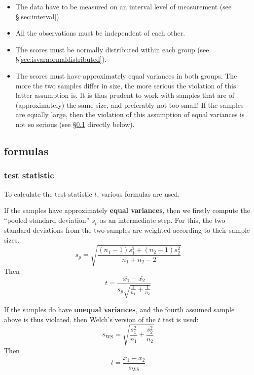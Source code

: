 \documentclass[
]{book}
\begin{document}
\begin{itemize}
\item
  The data have to be measured on an interval level of measurement (see
  §\ref{sec:interval}).
\item
  All the observations must be independent of each other.
\item
  The scores must be normally distributed within each group (see
  §\ref{sec:isvarnormaldistributed}).
\item
  The scores must have approximately equal variances in both groups.
  The more the two samples differ in size, the more
  serious the violation of this latter assumption is. It is thus prudent
  to work with samples that are of (approximately) the same size, and preferably not too small! If the samples are equally large, then the violation of this assumption of equal
  variances is not so serious (see §\ref{sec:ttest-formulas} directly below).
\end{itemize}

\hypertarget{sec:ttest-formulas}{%
\subsection{formulas}\label{sec:ttest-formulas}}

\hypertarget{test-statistic}{%
\subsubsection{test statistic}\label{test-statistic}}

To calculate the test statistic \(t\), various formulas are used.

If the samples have approximately \textbf{equal variances}, then we firstly compute
the ``pooled standard deviation'' \(s_p\) as an intermediate step. For this, the two
standard deviations from the two samples are weighted according
to their sample sizes.
\begin{equation}
    s_p = \sqrt{ \frac{(n_1-1) s^2_1 + (n_2-1) s^2_2} {n_1+n_2-2} }
    \label{eq:sd-pooled}
\end{equation}
Then
\begin{equation}
  \label{eq:t-homoskedastic}
  t = \frac{ \overline{x_1}-\overline{x_2} } { s_p \sqrt{\frac{1}{n_1}+\frac{1}{n_2}} }
\end{equation}

If the samples do have \textbf{unequal variances}, and the fourth assumed
sample above is thus violated, then Welch's version of the \(t\) test is
used:
\begin{equation}
  \label{eq:sd-WS}
  s_{\textrm{WS}} = \sqrt{\frac{s^2_1}{n_1}+\frac{s^2_2}{n_2} }
\end{equation}
Then
\begin{equation}
  \label{eq:t-WS}
  t = \frac{ \overline{x_1}-\overline{x_2} } { s_{\textrm{WS}} }
\end{equation}
\end{document}
